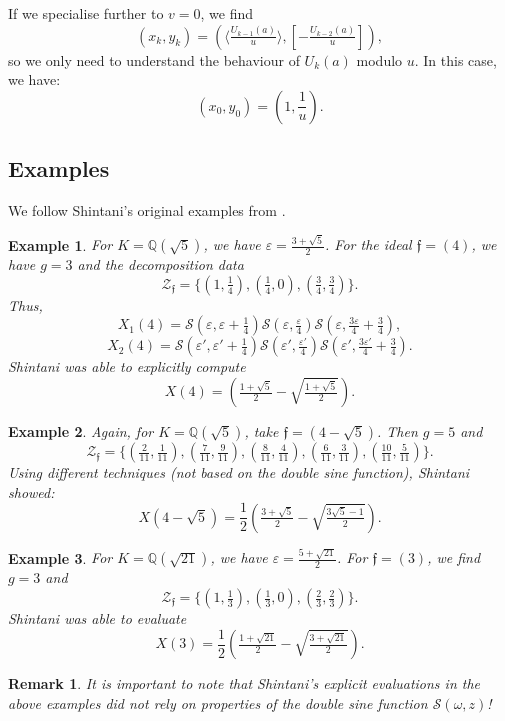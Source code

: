 \documentclass[11pt, a4paper]{amsart}
\newcommand{\ep}{\varepsilon}
\newcommand{\eq}[1]{\begin{equation}#1\end{equation}}
\theoremstyle{plain}
\newtheorem{example}{Example}[section]
\newtheorem{remark}{Remark}[section]
\numberwithin{equation}{section}
\begin{document}
If we specialise further to $v=0$, we find \eq{(x_k,y_k) = (\langle \tfrac{U_{k-1}(a)}{u} \rangle,[-\tfrac{U_{k-2}(a)}{u}]),} so we only need to understand the behaviour of $U_{k}(a)$ modulo $u$. 
In this case, we have: \eq{\label{initialu}(x_0,y_0) = (1,\frac{1}{u}).}

\subsection{Examples}
\label{examples}
We follow Shintani's original examples from \cite{Shintani1977}.

\begin{example}
For $K = \mathbb Q(\sqrt 5 )$, we have $\ep = \tfrac{3+\sqrt{5}} 2$. For the ideal $\mathfrak f = (4)$, we have $g = 3$ and the decomposition data \eq{\mathcal Z _\mathfrak f = \{(1,\tfrac 1 4),(\tfrac 1 4,0),(\tfrac 3 4 , \tfrac 3 4)\}.} Thus, \eq{X_1(4) = \mathcal S(\ep,\ep+\tfrac 1 4)\mathcal S (\ep,\tfrac \ep 4)\mathcal S(\ep,\tfrac{3 \ep}{4}+\tfrac 3 4),} \eq{X_2(4) = \mathcal S(\ep',\ep'+\tfrac 1 4)\mathcal S (\ep',\tfrac{\ep'} 4)\mathcal S(\ep',\tfrac{3 \ep'} 4 + \tfrac 3 4).} Shintani was able to explicitly compute \eq{X(4) = \left(\tfrac{1+\sqrt{5}}{2}-\sqrt{\tfrac{1+\sqrt{5}}{2}}\right ).} 
\end{example}
 
\begin{example}
Again, for $K=\mathbb Q(\sqrt 5)$, take $\mathfrak f = (4-\sqrt{5})$. Then $g = 5$ and \eq{\mathcal Z _\mathfrak f = \{(\tfrac 2 {11},\tfrac 1 {11}),(\tfrac 7 {11},\tfrac 9 {11}),(\tfrac 8 {11} , \tfrac 4 {11}),(\tfrac 6 {11}, \tfrac 3 {11}),(\tfrac {10} {11}, \tfrac 5 {11})\}.} 
Using different techniques (not based on the double sine function), Shintani showed: \eq{X(4-\sqrt{5}) = \frac 1 2 \left (\tfrac {3+\sqrt{5}} 2 - \sqrt{\tfrac{3 \sqrt{5}-1} 2} \right).}
\end{example}
\begin{example}

For $K = \mathbb Q(\sqrt{21})$, we have $\ep = \tfrac{5+\sqrt{21}}{2}$. For $\mathfrak f = (3)$, we find $g = 3$ and \eq{\mathcal Z _\mathfrak f = \{(1,\tfrac 1 3),(\tfrac 1 3 ,0),(\tfrac 2 3 , \tfrac 2 3)\}.} Shintani was able to evaluate \eq{X(3) = \frac 1 2 \left (\tfrac{1+\sqrt{21}}{2}-\sqrt{\tfrac{3+\sqrt{21}}{2}} \right ).}
\end{example}

\begin{remark}
It is important to note that Shintani’s explicit evaluations in the above examples did not rely on properties of the double sine function $\mathcal S(\omega,z)$! 
\end{remark}
\end{document}

